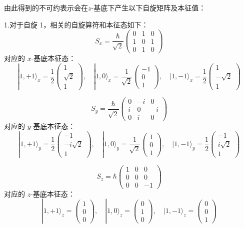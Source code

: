 由此得到的不可约表示会在\(z\)-基底下产生以下自旋矩阵及本征值：

1.对于自旋 1，相关的自旋算符和本征态如下：
\[
S_x = \frac{\hbar}{\sqrt{2}}
\begin{pmatrix}
0 & 1 & 0 \\
1 & 0 & 1 \\
0 & 1 & 0
\end{pmatrix}~
\]
对应的 \( x \)-基底本征态：
\[
|1, +1\rangle_x = \frac{1}{2}
\begin{pmatrix}
1 \\
\sqrt{2} \\
1
\end{pmatrix},
\quad
|1, 0\rangle_x = \frac{1}{\sqrt{2}}
\begin{pmatrix}
-1 \\
0 \\
1
\end{pmatrix},
\quad
|1, -1\rangle_x = \frac{1}{2}
\begin{pmatrix}
1 \\
-\sqrt{2} \\
1
\end{pmatrix}~
\]

\[
S_y = \frac{\hbar}{\sqrt{2}}
\begin{pmatrix}
0 & -i & 0 \\
i & 0 & -i \\
0 & i & 0
\end{pmatrix}~
\]
对应的 \( y \)-基底本征态：
\[
|1, +1\rangle_y = \frac{1}{2}
\begin{pmatrix}
-1 \\
-i\sqrt{2} \\
1
\end{pmatrix},
\quad
|1, 0\rangle_y = \frac{1}{\sqrt{2}}
\begin{pmatrix}
1 \\
0 \\
1
\end{pmatrix},
\quad
|1, -1\rangle_y = \frac{1}{2}
\begin{pmatrix}
-1 \\
i\sqrt{2} \\
1
\end{pmatrix}~
\]

\[
S_z = \hbar
\begin{pmatrix}
1 & 0 & 0 \\
0 & 0 & 0 \\
0 & 0 & -1
\end{pmatrix}~
\]
对应的 \( z \)-基底本征态：
\[
|1, +1\rangle_z =
\begin{pmatrix}
1 \\
0 \\
0
\end{pmatrix},
\quad
|1, 0\rangle_z =
\begin{pmatrix}
0 \\
1 \\
0
\end{pmatrix},
\quad
|1, -1\rangle_z =
\begin{pmatrix}
0 \\
0 \\
1
\end{pmatrix}~
\]

